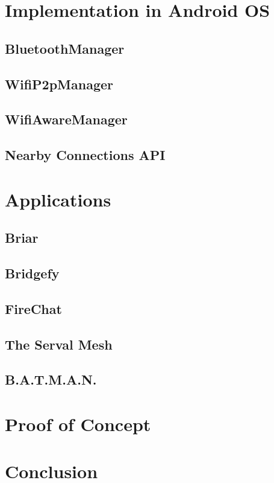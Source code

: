 \documentclass[conference,compsoc]{IEEEtran}
\begin{document}
\section{Implementation in Android OS} \label{android}
\subsection{BluetoothManager}
\subsection{WifiP2pManager}
\subsection{WifiAwareManager}
\subsection{Nearby Connections API}

\section{Applications} \label{applications}
\subsection{Briar}
\subsection{Bridgefy}
\subsection{FireChat}
\subsection{The Serval Mesh}
\subsection{B.A.T.M.A.N.}

\section{Proof of Concept} \label{poc}
\section{Conclusion} \label{conclusion}



\end{document}

